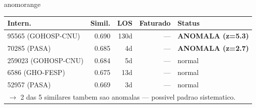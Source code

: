 \documentclass[a4paper,10pt]{article}
\begin{document}
\begin{anomalycard}[Internacao 163845 | GHO-PETROBRAS | ALTO (z=4.13)]{anomorange}
\begin{tabular}{l r r r l}\toprule\textbf{Intern.} & \textbf{Simil.} & \textbf{LOS} & \textbf{Faturado} & \textbf{Status} \\\midrule
95565 (GOHOSP-CNU) & 0.690 & 130d & --- & \textcolor{anomred}{\textbf{ANOMALA (z=5.3)}} \\
70285 (PASA) & 0.685 & 4d & --- & \textcolor{anomred}{\textbf{ANOMALA (z=2.7)}} \\
259023 (GOHOSP-CNU) & 0.684 & 5d & --- & \textcolor{jcubeblue}{normal} \\
6586 (GHO-FESP) & 0.675 & 13d & --- & \textcolor{jcubeblue}{normal} \\
52957 (PASA) & 0.669 & 3d & --- & \textcolor{jcubeblue}{normal} \\
\multicolumn{5}{l}{\textcolor{anomred}{\small $\rightarrow$ 2 das 5 similares tambem sao anomalas --- possivel padrao sistematico.}} \\
\bottomrule\end{tabular}


\end{anomalycard}

\newpage
\end{document}
